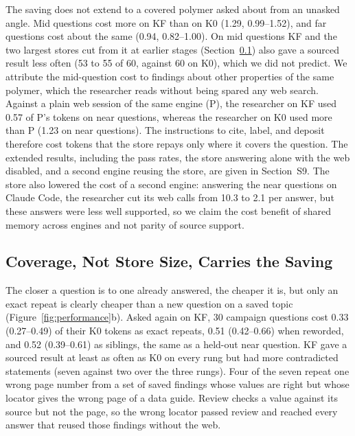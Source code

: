 \documentclass[journal=mamobx,manuscript=article]{achemso}
\begin{document}
The saving does not extend to a covered polymer asked about from an unasked angle.
Mid questions cost more on KF than on K0 (1.29, 0.99--1.52), and far questions cost about the same (0.94, 0.82--1.00).
On mid questions KF and the two largest stores cut from it at earlier stages (Section~\ref{sec:coverage}) also gave a sourced result less often (53 to 55 of 60, against 60 on K0), which we did not predict.
We attribute the mid-question cost to findings about other properties of the same polymer, which the researcher reads without being spared any web search.
Against a plain web session of the same engine (P), the researcher on KF used 0.57 of P's tokens on near questions, whereas the researcher on K0 used more than P (1.23 on near questions).
The instructions to cite, label, and deposit therefore cost tokens that the store repays only where it covers the question.
The extended results, including the pass rates, the store answering alone with the web disabled, and a second engine reusing the store, are given in Section~S9.
The store also lowered the cost of a second engine: answering the near questions on Claude Code, the researcher cut its web calls from 10.3 to 2.1 per answer, but these answers were less well supported, so we claim the cost benefit of shared memory across engines and not parity of source support.

\subsection{Coverage, Not Store Size, Carries the Saving}
\label{sec:coverage}

The closer a question is to one already answered, the cheaper it is, but only an exact repeat is clearly cheaper than a new question on a saved topic (Figure~\ref{fig:performance}b).
Asked again on KF, 30 campaign questions cost 0.33 (0.27--0.49) of their K0 tokens as exact repeats, 0.51 (0.42--0.66) when reworded, and 0.52 (0.39--0.61) as siblings, the same as a held-out near question.
KF gave a sourced result at least as often as K0 on every rung but had more contradicted statements (seven against two over the three rungs).
Four of the seven repeat one wrong page number from a set of saved findings whose values are right but whose locator gives the wrong page of a data guide.
Review checks a value against its source but not the page, so the wrong locator passed review and reached every answer that reused those findings without the web.
\end{document}
